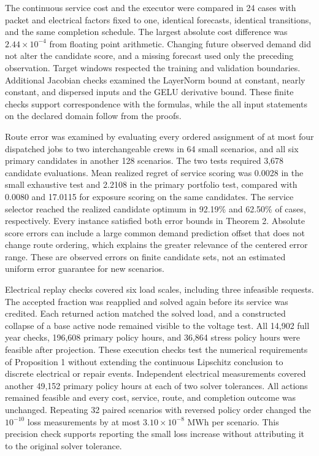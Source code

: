 \documentclass[journal]{IEEEtran}
\providecommand{\DIFadd}[1]{{\protect\color{blue}\uwave{#1}}} %
\renewcommand{\DIFadd}[1]{{\color{blue}#1}}
\begin{document}
\DIFadd{The continuous service cost and the executor were compared in 24 cases with
packet and electrical factors fixed to one, identical forecasts, identical
transitions, and the same completion schedule.  The largest absolute cost
difference was $2.44\times10^{-4}$ from floating point arithmetic.  Changing
future observed demand did not alter the candidate score, and a missing
forecast used only the preceding observation.  Target windows respected the
training and validation boundaries.  Additional Jacobian checks examined the
LayerNorm bound at constant, nearly constant, and dispersed inputs and the
GELU derivative bound.  These finite checks support correspondence with the
formulas, while the all input statements on the declared domain follow from
the proofs.
}

\DIFadd{Route error was examined by evaluating every ordered assignment of at most
four dispatched jobs to two interchangeable crews in 64 small scenarios, and
all six primary candidates in another 128 scenarios.  The two tests required
3,678 candidate evaluations.  Mean realized regret of service scoring was
0.0028 in the small exhaustive test and 2.2108 in the primary portfolio test,
compared with 0.0080 and 17.0115 for exposure scoring on the same candidates.
The service selector reached the realized candidate optimum in 92.19\% and
62.50\% of cases, respectively.  Every instance satisfied both error bounds in
Theorem 2.  Absolute score errors can include a large common demand prediction
offset that does not change route ordering, which explains the greater
relevance of the centered error range.  These are observed errors on finite
candidate sets, not an estimated uniform error guarantee for new scenarios.
}

\DIFadd{Electrical replay checks covered six load scales, including three infeasible
requests.  The accepted fraction was reapplied and solved again before its
service was credited.  Each returned action matched the solved load, and a
constructed collapse of a base active node remained visible to the voltage
test.  All 14,902 full year checks, 196,608 primary policy hours, and 36,864
stress policy hours were feasible after projection.  These execution checks
test the numerical requirements of Proposition 1 without extending the
continuous Lipschitz conclusion to discrete electrical or repair events.
Independent electrical measurements covered another 49,152 primary policy
hours at each of two solver tolerances.  All actions remained feasible and
every cost, service, route, and completion outcome was unchanged.
Repeating 32 paired scenarios with reversed policy order changed the
$10^{-10}$ loss measurements by at most $3.10\times10^{-8}$ MWh per scenario.
This precision check supports reporting the small loss increase without
attributing it to the original solver tolerance.
}
\end{document}
